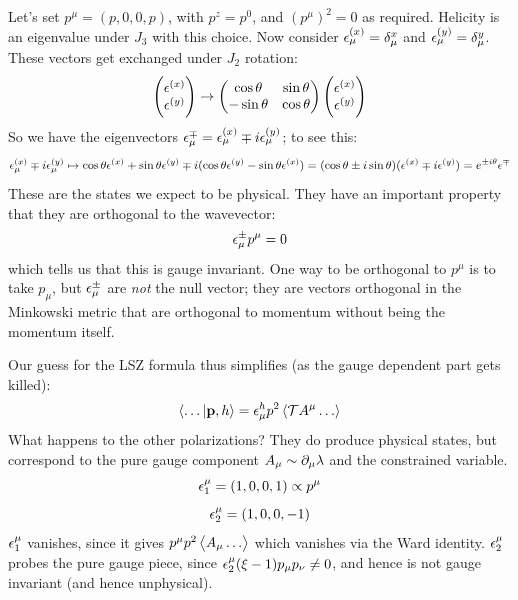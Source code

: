 Let's set $p^\mu = (p, 0, 0, p)$, with $p^z = p^0$, and $(p^\mu)^2 = 0$ as required. Helicity is an eigenvalue under $J_3$ with this choice. Now consider $\epsilon^{(x)}_\mu = \delta^x_\mu$ and $\epsilon^{(y)}_\mu = \delta^y_\mu$. These vectors get exchanged under $J_2$ rotation:
\begin{equation}
    \begin{pmatrix}\epsilon^{(x)} \\ \epsilon^{(y)}\end{pmatrix} \to \begin{pmatrix}\cos\theta & \sin\theta \\ -\sin\theta & \cos\theta\end{pmatrix}\begin{pmatrix}\epsilon^{(x)} \\ \epsilon^{(y)}\end{pmatrix}
\end{equation}
So we have the eigenvectors $\epsilon^\mp_\mu = \epsilon^{(x)}_\mu \mp i\epsilon^{(y)}_\mu$; to see this:
\begin{equation}
    \epsilon^{(x)}_\mu \mp i\epsilon^{(y)}_\mu \mapsto \cos\theta \epsilon^{(x)} + \sin\theta \epsilon^{(y)} \mp i(\cos\theta \epsilon^{(y)}  - \sin\theta \epsilon^{(x)}) = (\cos\theta \pm i\sin\theta)(\epsilon^{(x)} \mp i\epsilon^{(y)}) = e^{\pm i\theta}\epsilon^{\mp}
\end{equation}
These are the states we expect to be physical. They have an important property that they are orthogonal to the wavevector:
\begin{equation}
    \epsilon^{\pm}_\mu p^\mu = 0
\end{equation}
which tells us that this is gauge invariant. One way to be orthogonal to $p^\mu$ is to take $p_\mu$, but $\epsilon^\pm_\mu$ are \emph{not} the null vector; they are vectors orthogonal in the Minkowski metric that are orthogonal to momentum without being the momentum itself.

Our guess for the LSZ formula thus simplifies (as the gauge dependent part gets killed):
\begin{equation}
    \langle \ldots \lvert \mathbf{p}, h \rangle = \epsilon^h_\mu p^2\left< \mathcal{T}A^\mu\ldots \right>
\end{equation}
What happens to the other polarizations? They do produce physical states, but correspond to the pure gauge component $A_\mu \sim \partial_\mu \lambda$ and the constrained variable.
\begin{equation}
    \epsilon^\mu_1 = (1, 0, 0, 1) \propto p^\mu
\end{equation}
\begin{equation}
    \epsilon^\mu_2 = (1, 0, 0, -1)
\end{equation}
$\epsilon^\mu_1$ vanishes, since it gives $p^\mu p^2\left< A_\mu \ldots  \right>$ which vanishes via the Ward identity. $\epsilon^\mu_2$ probes the pure gauge piece, since $\epsilon^\mu_2(\xi - 1)p_\mu p_\nu \neq 0$, and hence is not gauge invariant (and hence unphysical).

